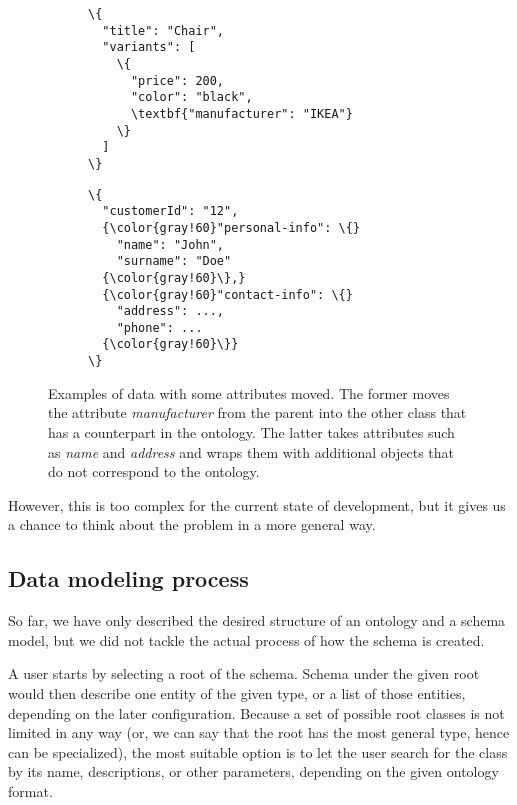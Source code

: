 \begin{figure}[h!]\centering
  \begin{subfigure}[b]{.5\textwidth}
    \begin{Verbatim}[commandchars=\\\{\}]
\{
  "title": "Chair",
  "variants": [
    \{
      "price": 200,
      "color": "black",
      \textbf{"manufacturer": "IKEA"}
    \}
  ]
\}
    \end{Verbatim}
  \end{subfigure}%
  \begin{subfigure}[b]{.5\textwidth}
    \begin{Verbatim}[commandchars=\\\{\}]
\{
  "customerId": "12",
  {\color{gray!60}"personal-info": \{}
    "name": "John",
    "surname": "Doe"
  {\color{gray!60}\},}
  {\color{gray!60}"contact-info": \{}
    "address": ...,
    "phone": ...
  {\color{gray!60}\}}
\}
    \end{Verbatim}
    \end{subfigure}%
  \caption{Examples of data with some attributes moved. The former moves the attribute \textit{manufacturer} from the parent into the other class that has a counterpart in the ontology. The latter takes attributes such as \textit{name} and \textit{address} and wraps them with additional objects that do not correspond to the ontology.}
\end{figure}

However, this is too complex for the current state of development, but it gives us a chance to think about the problem in a more general way.

\subsection{Data modeling process}

So far, we have only described the desired structure of an ontology and a schema model, but we did not tackle the actual process of how the schema is created.

A user starts by selecting a root of the schema. Schema under the given root would then describe one entity of the given type, or a list of those entities, depending on the later configuration. Because a set of possible root classes is not limited in any way (or, we can say that the root has the most general type, hence can be specialized), the most suitable option is to let the user search for the class by its name, descriptions, or other parameters, depending on the given ontology format.

